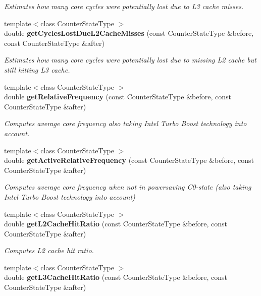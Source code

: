 \begin{DoxyCompactItemize}
\begin{DoxyCompactList}\small\item\em Estimates how many core cycles were potentially lost due to L3 cache misses. \end{DoxyCompactList}\item 
{\footnotesize template$<$class Counter\+State\+Type $>$ }\\double {\bf get\+Cycles\+Lost\+Due\+L2\+Cache\+Misses} (const Counter\+State\+Type \&before, const Counter\+State\+Type \&after)
\begin{DoxyCompactList}\small\item\em Estimates how many core cycles were potentially lost due to missing L2 cache but still hitting L3 cache. \end{DoxyCompactList}\item 
{\footnotesize template$<$class Counter\+State\+Type $>$ }\\double {\bf get\+Relative\+Frequency} (const Counter\+State\+Type \&before, const Counter\+State\+Type \&after)
\begin{DoxyCompactList}\small\item\em Computes average core frequency also taking Intel Turbo Boost technology into account. \end{DoxyCompactList}\item 
{\footnotesize template$<$class Counter\+State\+Type $>$ }\\double {\bf get\+Active\+Relative\+Frequency} (const Counter\+State\+Type \&before, const Counter\+State\+Type \&after)
\begin{DoxyCompactList}\small\item\em Computes average core frequency when not in powersaving C0-\/state (also taking Intel Turbo Boost technology into account) \end{DoxyCompactList}\item 
{\footnotesize template$<$class Counter\+State\+Type $>$ }\\double {\bf get\+L2\+Cache\+Hit\+Ratio} (const Counter\+State\+Type \&before, const Counter\+State\+Type \&after)
\begin{DoxyCompactList}\small\item\em Computes L2 cache hit ratio. \end{DoxyCompactList}\item 
{\footnotesize template$<$class Counter\+State\+Type $>$ }\\double {\bf get\+L3\+Cache\+Hit\+Ratio} (const Counter\+State\+Type \&before, const Counter\+State\+Type \&after)

\end{DoxyCompactItemize}
